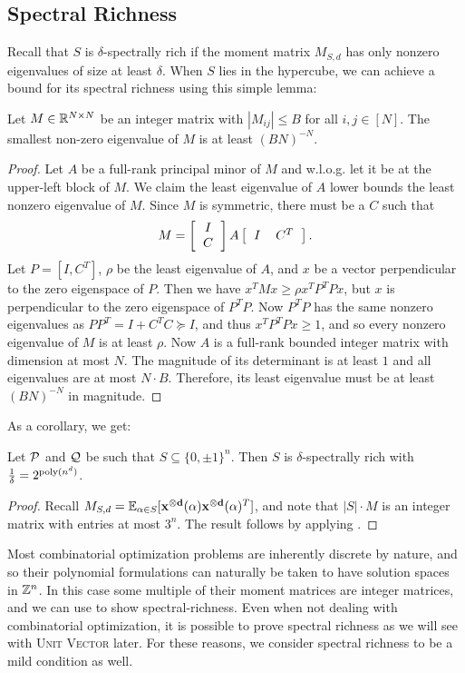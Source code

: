 \subsection{Spectral Richness}
Recall that $S$ is $\delta$-spectrally rich if the moment matrix $M_{S,d}$ has only nonzero eigenvalues of size at least $\delta$. When $S$ lies in the hypercube, we can achieve a bound for its spectral richness using this simple lemma:
\begin{lemma} \label{lem:integer}
	Let $M \in \mathbb R^{N \times N}$ be an integer matrix with $|M_{ij}| \leq B$ for all $i,j \in [N]$.  The smallest non-zero eigenvalue of $M$ is at least 
	$(BN)^{-N}$.
\end{lemma}
\begin{proof}
Let $A$ be a full-rank principal minor of $M$ and w.l.o.g. let it be at the upper-left block of $M$. We claim the least eigenvalue of $A$ lower bounds the least nonzero eigenvalue of $M$.
%
Since $M$ is symmetric, there must be a $C$ such that
\[M = \left[\begin{tabular}{c} $I$ \\ $C$\end{tabular}\right]A\left[\begin{tabular}{cc} $I$ & $C^T$\end{tabular}\right].\]
Let $P = [I, C^T]$, $\rho$ be the least eigenvalue of $A$, and $x$ be a vector perpendicular to the zero eigenspace of $P$. Then we have $x^TMx \geq \rho x^TP^TPx$,
but $x$ is perpendicular to the zero eigenspace of $P^TP$. Now $P^TP$ has the same nonzero eigenvalues as $PP^T = I + C^TC \succeq I$, and thus $x^TP^TPx \geq 1$, and so every nonzero eigenvalue of $M$ is at least $\rho$. Now $A$ is a full-rank bounded integer matrix with dimension at most $N$. The magnitude of its determinant is at least $1$ and all eigenvalues are at most $N \cdot B$.  Therefore, its least eigenvalue must be at least $(BN)^{-N}$ in magnitude. 
\end{proof}
As a corollary, we get:
\begin{corollary}\label{cor:integer-rich}
Let $\mathcal P$ and $\mathcal Q$ be such that $S \subseteq \{0,\pm 1\}^n$. Then $S$ is $\delta$-spectrally rich with $\frac{1}{\delta} = 2^{\operatorname{poly}(n^d)}$.
\end{corollary}
\begin{proof}
	Recall $M_{S,d} = \operatorname*{\mathbb{E}}_{\alpha \in S}[\mathbf{x^{\otimes d}}(\alpha)\mathbf{x^{\otimes d}}(\alpha)^T]$, and note that $|S| \cdot M$ is an integer matrix with entries at most $3^n$.  The result follows by applying . 
\end{proof}
Most combinatorial optimization problems are inherently discrete by nature, and so their polynomial formulations can naturally be taken to have solution spaces in $\mathbb Z^n$. In this case some multiple of their moment matrices are integer matrices, and we can use  to show spectral-richness. Even when not dealing with combinatorial optimization, it is possible to prove spectral richness as we will see with \textsc{Unit Vector} later. For these reasons, we consider spectral richness to be a mild condition as well.

